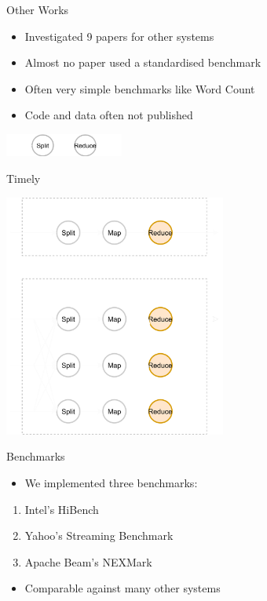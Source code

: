 \documentclass[14pt,t]{beamer}
\renewcommand{\title}[1]{
  {\huge #1} \vskip 0.4cm
}
\begin{document}
\begin{frame}
  \title{Other Works}
  \begin{itemize}
  \item Investigated 9 papers for other systems
  \item Almost no paper used a standardised benchmark
  \item Often very simple benchmarks like Word Count
  \item Code and data often not published
  \end{itemize}
  \vspace{1cm}
  \begin{center}
    \includegraphics[height=0.75cm]{hib-3.png}
  \end{center}
\end{frame}

\begin{frame}
  \title{Timely}
  \begin{center}
    \includegraphics[height=8cm]{dataflow.png}
  \end{center}
\end{frame}

\begin{frame}
  \title{Benchmarks}
  \begin{itemize}
  \item We implemented three benchmarks:
  \end{itemize}
  \begin{enumerate}
  \item Intel's HiBench
  \item Yahoo's Streaming Benchmark
  \item Apache Beam's NEXMark
  \end{enumerate}
  \begin{itemize}
  \item Comparable against many other systems
  \end{itemize}
\end{frame}
\end{document}
